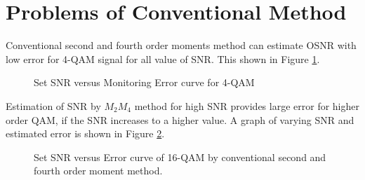 \documentclass[12pt]{report}
\begin{document}
\section{Problems of Conventional Method}
Conventional second and fourth order moments method can estimate OSNR with low error for 4-QAM signal for all value of SNR. This shown in Figure \ref{fig:4-qam-error}.
\begin{figure}[htbp]
	\caption{Set SNR versus Monitoring Error curve for 4-QAM}
	\label{fig:4-qam-error}
\end{figure}

Estimation of SNR by $M_2 M_4$ method for high SNR provides large error for higher order QAM, if the SNR increases to a higher value. A graph of varying SNR and estimated error is shown in Figure \ref{fig:standardm2m4error}.
\begin{figure}[htbp]
	\caption{Set SNR versus Error curve of 16-QAM by conventional second and fourth order moment method.}
	\label{fig:standardm2m4error}
\end{figure}
\end{document}
